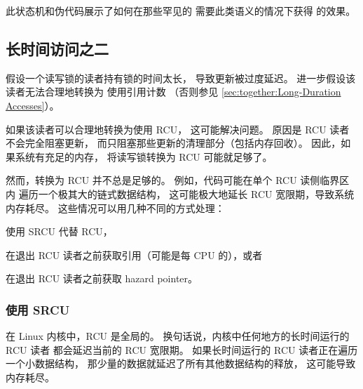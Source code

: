 此状态机和伪代码展示了如何在那些罕见的
需要此类语义的情况下获得  的效果。

\subsection{长时间访问之二}
\label{sec:together:Long-Duration Accesses Two}

假设一个读写锁的读者持有锁的时间太长，
导致更新被过度延迟。
进一步假设该读者无法合理地转换为
使用引用计数
（否则参见 \cref{sec:together:Long-Duration Accesses}）。

如果该读者可以合理地转换为使用 RCU，
这可能解决问题。
原因是 RCU 读者不会完全阻塞更新，
而只阻塞那些更新的清理部分（包括内存回收）。
因此，如果系统有充足的内存，
将读写锁转换为 RCU 可能就足够了。

然而，转换为 RCU 并不总是足够的。
例如，代码可能在单个 RCU 读侧临界区内
遍历一个极其大的链式数据结构，
这可能极大地延长 RCU 宽限期，导致系统内存耗尽。
这些情况可以用几种不同的方式处理：
\begin{enumerate*}[(1)]
\item	使用 SRCU 代替 RCU，
\item	在退出 RCU 读者之前获取引用（可能是每 CPU 的），或者
\item	在退出 RCU 读者之前获取 hazard pointer。
\end{enumerate*}

\QuickQuizEnd

\subsubsection{使用 SRCU}
\label{sec:together:Use SRCU}

在 Linux 内核中，RCU 是全局的。
换句话说，内核中任何地方的长时间运行的 RCU 读者
都会延迟当前的 RCU 宽限期。
如果长时间运行的 RCU 读者正在遍历一个小数据结构，
那少量的数据就延迟了所有其他数据结构的释放，
这可能导致内存耗尽。

